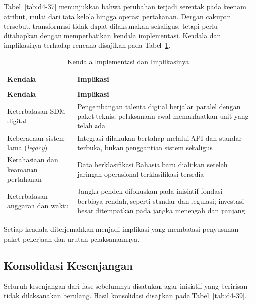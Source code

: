 Tabel~\ref{tab:d4-37} menunjukkan bahwa perubahan terjadi serentak pada keenam atribut, mulai dari tata kelola hingga operasi pertahanan. Dengan cakupan tersebut, transformasi tidak dapat dilaksanakan sekaligus, tetapi perlu ditahapkan dengan memperhatikan kendala implementasi. Kendala dan implikasinya terhadap rencana disajikan pada Tabel~\ref{tab:d4-38}.

\begin{longtable}{@{}>{\raggedright\arraybackslash}p{}>{\raggedright\arraybackslash}p{}@{}}
\caption{Kendala Implementasi dan Implikasinya}
\label{tab:d4-38}\\
\toprule
\textbf{Kendala} & \textbf{Implikasi}\\
\midrule
\endfirsthead
\multicolumn{2}{@{}l}{\small\itshape \tablename\ \thetable{} (lanjutan)}\\
\toprule
\textbf{Kendala} & \textbf{Implikasi}\\
\midrule
\endhead
\bottomrule
\endlastfoot
Keterbatasan SDM digital & Pengembangan talenta digital berjalan paralel dengan paket teknis; pelaksanaan awal memanfaatkan unit yang telah ada\\
Keberadaan sistem lama (\textit{legacy}) & Integrasi dilakukan bertahap melalui API dan standar terbuka, bukan penggantian sistem sekaligus\\
Kerahasiaan dan keamanan pertahanan & Data berklasifikasi Rahasia baru dialirkan setelah jaringan operasional terklasifikasi tersedia\\
Keterbatasan anggaran dan waktu & Jangka pendek difokuskan pada inisiatif fondasi berbiaya rendah, seperti standar dan regulasi; investasi besar ditempatkan pada jangka menengah dan panjang\\
\end{longtable}

Setiap kendala diterjemahkan menjadi implikasi yang membatasi penyusunan paket pekerjaan dan urutan pelaksanaannya.

\subsection{Konsolidasi Kesenjangan}

Seluruh kesenjangan dari fase sebelumnya disatukan agar inisiatif yang beririsan tidak dilaksanakan berulang. Hasil konsolidasi disajikan pada Tabel~\ref{tab:d4-39}.

